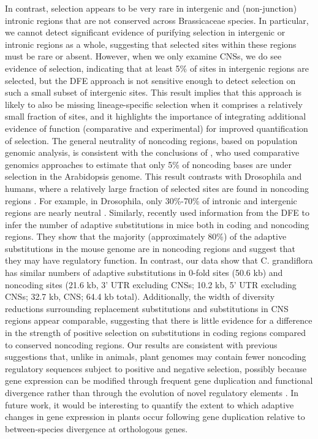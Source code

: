 In contrast, selection appears to be very rare in intergenic and (non-junction) intronic regions that are not conserved across Brassicaceae species. In particular, we cannot detect significant evidence of purifying selection in intergenic or intronic regions as a whole, suggesting that selected sites within these regions must be rare or absent. However, when we only examine CNSs, we do see evidence of selection, indicating that at least 5\% of sites in intergenic regions are selected, but the DFE approach is not sensitive enough to detect selection on such a small subset of intergenic sites. This result implies that this approach is likely to also be missing lineage-specific selection when it comprises a relatively small fraction of sites, and it highlights the importance of integrating additional evidence of function (comparative and experimental) for improved quantification of selection.
The general neutrality of noncoding regions, based on population genomic analysis, is consistent with the conclusions of \citet{Haudry2013-qe}, who used comparative genomics approaches to estimate that only 5\% of noncoding bases are under selection in the Arabidopsis genome. This result contrasts with Drosophila and humans, where a relatively large fraction of selected sites are found in noncoding regions \citep{hough2013}. For example, in Drosophila, only 30\%-70\% of intronic and intergenic regions are nearly neutral \citep{andolfatto2005,eyre2009, sella2009}. Similarly, \citet{Halligan2013} recently used information from the DFE to infer the number of adaptive substitutions in mice both in coding and noncoding regions. They show that the majority (approximately 80\%) of the adaptive substitutions in the mouse genome are in noncoding regions and suggest that they may have regulatory function. In contrast, our data show that C. grandiflora has similar numbers of adaptive substitutions in 0-fold sites (50.6 kb) and noncoding sites (21.6 kb, 3’ UTR excluding CNSs; 10.2 kb, 5’ UTR excluding CNSs; 32.7 kb, CNS; 64.4 kb total). Additionally, the width of diversity reductions surrounding replacement substitutions and substitutions in CNS regions appear comparable, suggesting that there is little evidence for a difference in the strength of positive selection on substitutions in coding regions compared to conserved noncoding regions. Our results are consistent with previous suggestions that, unlike in animals, plant genomes may contain fewer noncoding regulatory sequences subject to positive and negative selection, possibly because gene expression can be modified through frequent gene duplication and functional divergence rather than through the evolution of novel regulatory elements \citep{lockton2005}. In future work, it would be interesting to quantify the extent to which adaptive changes in gene expression in plants occur following gene duplication relative to between-species divergence at orthologous genes.

